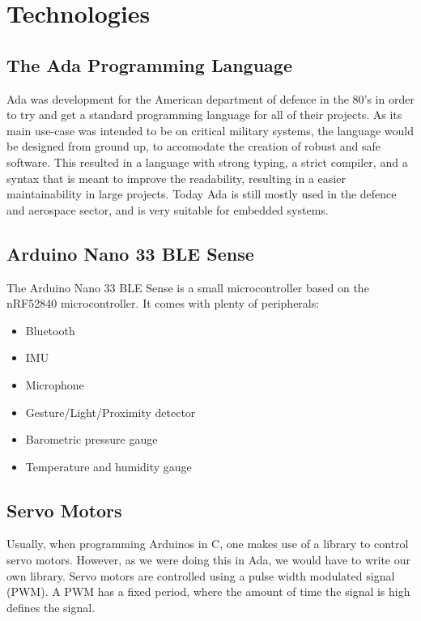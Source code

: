 \documentclass{article}
\begin{document}
\section{Technologies}

\subsection{The Ada Programming Language}
Ada was development for the American department of defence in the 80's in order to try and get a standard programming language for all of their projects. As its main use-case was intended to be on critical military systems, the language would be designed from ground up, to accomodate the creation of robust and safe software. This resulted in a language with strong typing, a strict compiler, and a syntax that is meant to improve the readability, resulting in a easier maintainability in large projects. Today Ada is still mostly used in the defence and aerospace sector, and is very suitable for embedded systems.\\


\subsection{Arduino Nano 33 BLE Sense}

The Arduino Nano 33 BLE Sense is a small microcontroller based on the nRF52840 microcontroller.
It comes with plenty of peripherals:
\begin{itemize}
  \item Bluetooth
  \item IMU
  \item Microphone
  \item Gesture/Light/Proximity detector
  \item Barometric pressure gauge
  \item Temperature and humidity gauge
\end{itemize}

\subsection{Servo Motors}
Usually, when programming Arduinos in C, one makes use of a library to control servo motors. However, as we were doing this in Ada, we would have to write our own library. Servo motors are controlled using a pulse width modulated signal (PWM). A PWM has a fixed period, where the amount of time the signal is high defines the signal.
\end{document}
